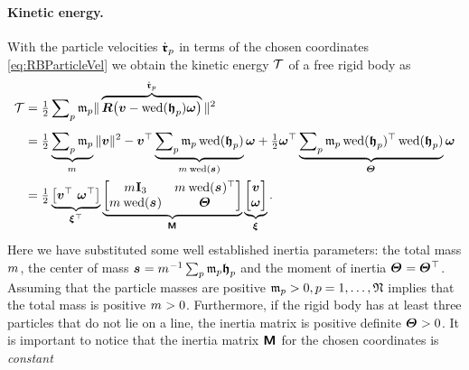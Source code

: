 \paragraph{Kinetic energy.}
With the particle velocities $\dot{\boldsymbol{\mathfrak{r}}}_{p}$ in terms of the chosen coordinates \eqref{eq:RBParticleVel} we obtain the kinetic energy $\mathcal{T}$ of a free rigid body as 
\begin{align}\label{eq:RigidBodyKineticEnergy}
 \kineticEnergy &= \tfrac{1}{2} \sumParticles \particleMass{\PidxI} \norm{\overbrace{\R \big( \v - \wedOp(\particleBodyPos{\PidxI}) \w \big)}^{\particlePosd{\PidxI}}}^2
\nonumber\\[1ex]
 &= \tfrac{1}{2} \underbrace{\sumParticles \particleMass{\PidxI}}_{\bodyMass{}{}} \norm{\v}^2
  - \v^\top \underbrace{\sumParticles \particleMass{\PidxI} \wedOp(\particleBodyPos{\PidxI})}_{\bodyMass{}{} \wedOp(\bodyCOM{}{})} \w
  + \tfrac{1}{2} \w^\top \underbrace{\sumParticles \particleMass{\PidxI} \wedOp(\particleBodyPos{\PidxI})^\top \wedOp(\particleBodyPos{\PidxI})}_{\bodyMOI{}{}} \w
\nonumber\\
 &= \tfrac{1}{2} \underbrace{\big[ \v^\top \ \w^\top \big]}_{\bodyVel{}{}^\top}
 \underbrace{\begin{bmatrix} \bodyMass{}{}\idMat[3] & \bodyMass{}{} \wedOp(\bodyCOM{}{})^\top \\ \bodyMass{}{} \wedOp(\bodyCOM{}{}) & \bodyMOI{}{} \end{bmatrix}}_{\bodyInertiaMat{}{}}
 \underbrace{\begin{bmatrix} \v \\ \w \end{bmatrix}}_{\bodyVel{}{}}
 .
\end{align}
Here we have substituted some well established inertia parameters: the total mass $\bodyMass{}{}$, the center of mass $\bodyCOM{}{} = \bodyMass{}{}^{-1} \sumParticles \particleMass{\PidxI} \particleBodyPos{\PidxI}$ and the moment of inertia $\bodyMOI{}{} = \bodyMOI{}{}^\top$.
Assuming that the particle masses are positive $\mathfrak{m}_{p} > 0, p=1,\ldots,\mathfrak{N}$ implies that the total mass is positive $\bodyMass{}{} > 0$.
Furthermore, if the rigid body has at least three particles that do not lie on a line, the inertia matrix is positive definite $\bodyMOI{}{} > 0$.
It is important to notice that the inertia matrix $\bodyInertiaMat{}{}$ for the chosen coordinates is \textit{constant}%
